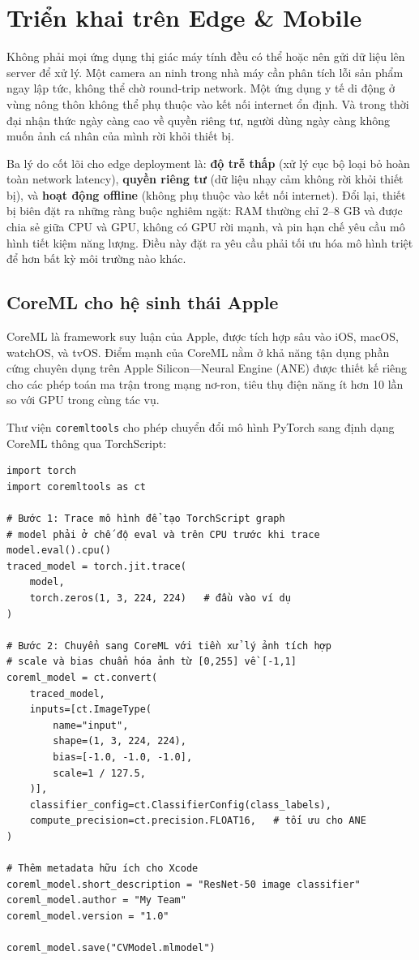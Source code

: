 \section{Triển khai trên Edge \& Mobile}
\label{sec:edge_deployment}

Không phải mọi ứng dụng thị giác máy tính đều có thể hoặc nên gửi dữ liệu lên server để xử lý. Một camera an ninh trong nhà máy cần phân tích lỗi sản phẩm ngay lập tức, không thể chờ round-trip network. Một ứng dụng y tế di động ở vùng nông thôn không thể phụ thuộc vào kết nối internet ổn định. Và trong thời đại nhận thức ngày càng cao về quyền riêng tư, người dùng ngày càng không muốn ảnh cá nhân của mình rời khỏi thiết bị.

Ba lý do cốt lõi cho edge deployment là: \textbf{độ trễ thấp} (xử lý cục bộ loại bỏ hoàn toàn network latency), \textbf{quyền riêng tư} (dữ liệu nhạy cảm không rời khỏi thiết bị), và \textbf{hoạt động offline} (không phụ thuộc vào kết nối internet). Đổi lại, thiết bị biên đặt ra những ràng buộc nghiêm ngặt: RAM thường chỉ 2--8 GB và được chia sẻ giữa CPU và GPU, không có GPU rời mạnh, và pin hạn chế yêu cầu mô hình tiết kiệm năng lượng. Điều này đặt ra yêu cầu phải tối ưu hóa mô hình triệt để hơn bất kỳ môi trường nào khác.

\subsection*{CoreML cho hệ sinh thái Apple}

CoreML là framework suy luận của Apple, được tích hợp sâu vào iOS, macOS, watchOS, và tvOS. Điểm mạnh của CoreML nằm ở khả năng tận dụng phần cứng chuyên dụng trên Apple Silicon---Neural Engine (ANE) được thiết kế riêng cho các phép toán ma trận trong mạng nơ-ron, tiêu thụ điện năng ít hơn 10 lần so với GPU trong cùng tác vụ.

Thư viện \texttt{coremltools} cho phép chuyển đổi mô hình PyTorch sang định dạng CoreML thông qua TorchScript:

\begin{verbatim}
import torch
import coremltools as ct

# Bước 1: Trace mô hình để tạo TorchScript graph
# model phải ở chế độ eval và trên CPU trước khi trace
model.eval().cpu()
traced_model = torch.jit.trace(
    model,
    torch.zeros(1, 3, 224, 224)   # đầu vào ví dụ
)

# Bước 2: Chuyển sang CoreML với tiền xử lý ảnh tích hợp
# scale và bias chuẩn hóa ảnh từ [0,255] về [-1,1]
coreml_model = ct.convert(
    traced_model,
    inputs=[ct.ImageType(
        name="input",
        shape=(1, 3, 224, 224),
        bias=[-1.0, -1.0, -1.0],
        scale=1 / 127.5,
    )],
    classifier_config=ct.ClassifierConfig(class_labels),
    compute_precision=ct.precision.FLOAT16,   # tối ưu cho ANE
)

# Thêm metadata hữu ích cho Xcode
coreml_model.short_description = "ResNet-50 image classifier"
coreml_model.author = "My Team"
coreml_model.version = "1.0"

coreml_model.save("CVModel.mlmodel")
\end{verbatim}

